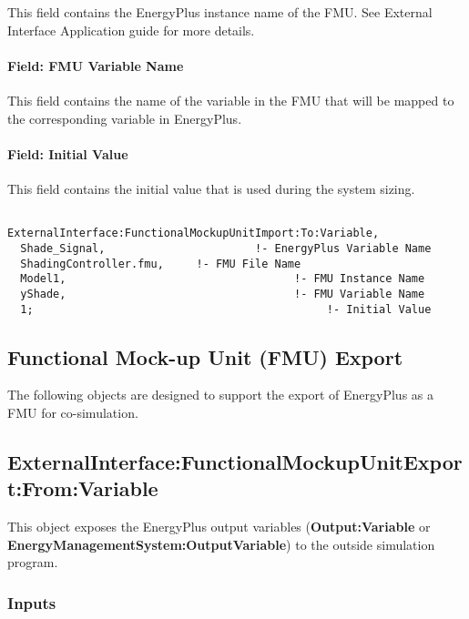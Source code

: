 This field contains the EnergyPlus instance name of the FMU. See External Interface Application guide for more details.

\paragraph{Field: FMU Variable Name}\label{field-fmu-variable-name-3}

This field contains the name of the variable in the FMU that will be mapped to the corresponding variable in EnergyPlus.

\paragraph{Field: Initial Value}\label{field-initial-value-5}

This field contains the initial value that is used during the system sizing.

\begin{lstlisting}

ExternalInterface:FunctionalMockupUnitImport:To:Variable,
  Shade_Signal,                       !- EnergyPlus Variable Name
  ShadingController.fmu,     !- FMU File Name
  Model1,                                   !- FMU Instance Name
  yShade,                                   !- FMU Variable Name
  1;                                             !- Initial Value
\end{lstlisting}

\subsection{Functional Mock-up Unit (FMU) Export}\label{functional-mock-up-unit-fmu-export}

The following objects are designed to support the export of EnergyPlus as a FMU for co-simulation.

\subsection{ExternalInterface:FunctionalMockupUnitExport:From:Variable}\label{externalinterfacefunctionalmockupunitexportfromvariable}

This object exposes the EnergyPlus output variables (\textbf{Output:Variable} or \textbf{EnergyManagementSystem:OutputVariable}) to the outside simulation program.

\subsubsection{Inputs}\label{inputs-9-006}

